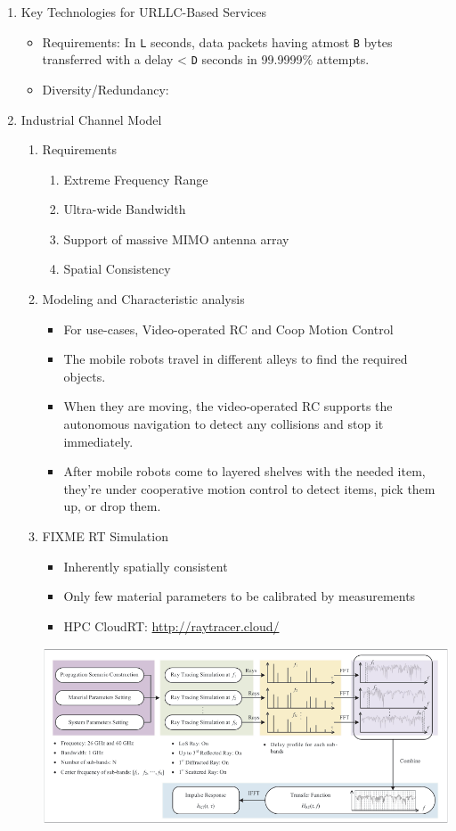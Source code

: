 \documentclass[11pt]{article}
\begin{document}
\begin{enumerate}
\begin{itemize}
\begin{enumerate}
\end{enumerate}
\end{itemize}
\item Key Technologies for URLLC-Based Services
\label{sec:org09e6c6f}
\begin{itemize}
\item Requirements: In \texttt{L} seconds, data packets having atmost \texttt{B} bytes transferred with a delay < \texttt{D} seconds in 99.9999\% attempts.
\item Diversity/Redundancy:
\end{itemize}
\item Industrial Channel Model
\label{sec:org64df033}
\begin{enumerate}
\item Requirements
\label{sec:org4983211}
\begin{enumerate}
\item Extreme Frequency Range
\item Ultra-wide Bandwidth
\item Support of massive MIMO antenna array
\item Spatial Consistency
\end{enumerate}
\item Modeling and Characteristic analysis
\label{sec:org9fed36b}
\begin{itemize}
\item For use-cases, Video-operated RC and Coop Motion Control
\item The mobile robots travel in different alleys to find the required objects.
\item When they are moving, the video-operated RC supports the autonomous navigation to detect any collisions and stop it immediately.
\item After mobile robots come to layered shelves with the needed item, they're under cooperative motion control to detect items, pick them up, or drop them.
\end{itemize}
\item FIXME RT Simulation
\label{sec:org7525a15}
\begin{itemize}
\item Inherently spatially consistent
\item Only few material parameters to be calibrated by measurements
\item HPC CloudRT: \url{http://raytracer.cloud/}
\end{itemize}
\begin{center}
\includegraphics[width=.9\linewidth]{./assets/p1f2.png}

\end{center}
\end{enumerate}
\end{enumerate}
\end{document}
